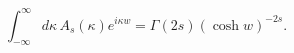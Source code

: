\begin{equation}
\int_{-\infty}^{\infty}d\kappa\,A_s(\kappa)e^{i\kappa w}
=\Gamma(2s)(\cosh w)^{-2s}.
\label{C1}
\end{equation}


